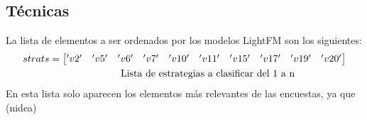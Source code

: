 \subsection{Técnicas}

La lista de elementos a ser ordenados por los modelos LightFM son los siguientes:
\begin{alignat*}{1}
strats = \begin{bmatrix} 'v2' & 'v5' & 'v6' & 'v7' & 'v10' & 'v11' & 'v15' & 'v17' & 'v19' & 'v20' \end{bmatrix} 
& \\
\parbox[t]{8cm}{\raggedright Lista de estrategias a clasificar del 1 a n} \nonumber
\end{alignat*}
En esta lista solo aparecen los elementos más relevantes de las encuestas, ya que (nidea)

